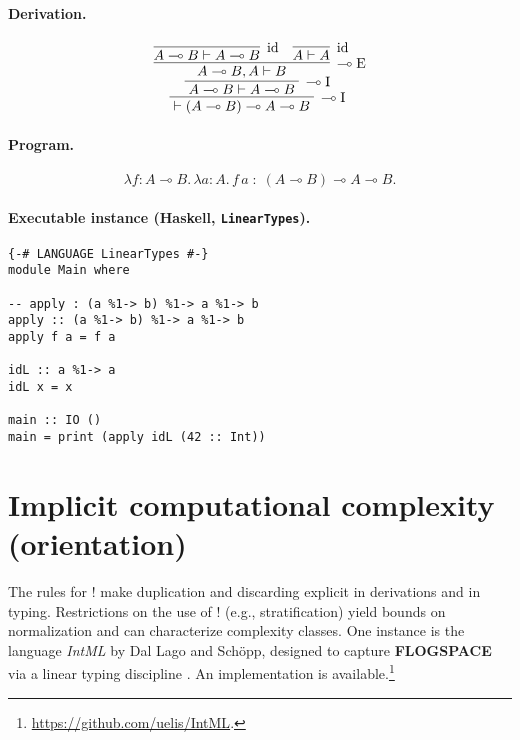 \paragraph{Derivation.}
\[
\infer[\multimap\mathrm{I}]{\; \vdash (A \multimap B) \multimap A \multimap B \;}{
  \infer[\multimap\mathrm{I}]{\; A \multimap B \vdash A \multimap B \;}{
    \infer[\multimap\mathrm{E}]{\; A \multimap B, A \vdash B \;}{
      \infer[\mathrm{id}]{A \multimap B \vdash A \multimap B}{}
      &
      \infer[\mathrm{id}]{A \vdash A}{}
    }
  }
}
\]

\paragraph{Program.}
\[
\lambda f{:}A \multimap B.\,\lambda a{:}A.\, f\,a \;:\; (A \multimap B) \multimap A \multimap B.
\]

\paragraph{Executable instance (Haskell, \texttt{LinearTypes}).}
\begin{verbatim}
{-# LANGUAGE LinearTypes #-}
module Main where

-- apply : (a %1-> b) %1-> a %1-> b
apply :: (a %1-> b) %1-> a %1-> b
apply f a = f a

idL :: a %1-> a
idL x = x

main :: IO ()
main = print (apply idL (42 :: Int))
\end{verbatim}

\section{Implicit computational complexity (orientation)}
\label{sec:icc-orientation}
The rules for ${!}$ make duplication and discarding explicit in derivations and in typing. Restrictions on the use of ${!}$ (e.g., stratification) yield bounds on normalization and can characterize complexity classes. One instance is the language \emph{IntML} by Dal Lago and Sch\"opp, designed to capture \textbf{FLOGSPACE} via a linear typing discipline \cite{DALLAGO2016150}. An implementation is available.\footnote{\url{https://github.com/uelis/IntML}.}
